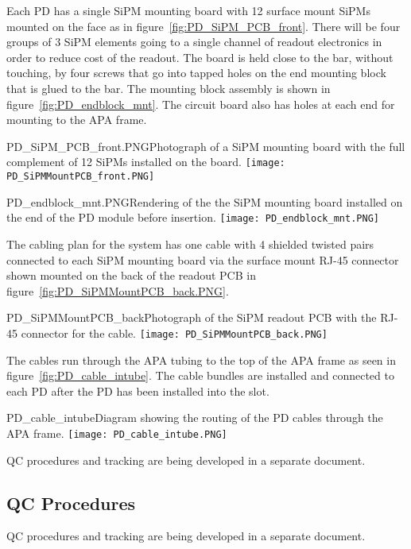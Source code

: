 Each PD has a single SiPM mounting board with 12 surface mount SiPMs 
mounted on the face as in figure~\ref{fig:PD_SiPM_PCB_front}.
There will be four groups of $3$ SiPM elements going to a single 
channel of readout electronics in order to reduce cost of the readout.
The board is held close to the bar, without touching, by four screws that go into 
tapped holes on the end  mounting block that is glued to the bar.  
The mounting block assembly is shown in figure~\ref{fig:PD_endblock_mnt}.
The circuit board also has holes at each end for mounting to the APA frame.  
\begin{cdrfigure}
  {PD_SiPM_PCB_front.PNG}{Photograph of a SiPM mounting board
    with the full complement of 12 SiPMs installed on the board.}
\texttt{[image: PD\_SiPMMountPCB\_front.PNG]}
\end{cdrfigure}
\begin{cdrfigure}
  {PD_endblock_mnt.PNG}{Rendering of the the SiPM mounting board
    installed on the end of the PD module before insertion.}
\texttt{[image: PD\_endblock\_mnt.PNG]}
\end{cdrfigure}


The cabling plan for the system has one cable with 4 shielded twisted pairs 
connected to each SiPM mounting board via the surface mount RJ-45 connector
shown mounted on the back of the readout PCB in 
figure~\ref{fig:PD_SiPMMountPCB_back.PNG}.  
\begin{cdrfigure}
  {PD_SiPMMountPCB_back}{Photograph of the SiPM readout PCB with the 
    RJ-45 connector for the cable.}
\texttt{[image: PD\_SiPMMountPCB\_back.PNG]}
\end{cdrfigure}
The cables run through the APA tubing to the top of the APA frame as seen
in figure~\ref{fig:PD_cable_intube}.
The cable bundles are installed and connected to each PD 
after the PD has been installed into the slot.
\begin{cdrfigure}
  {PD_cable_intube}{Diagram showing the routing of the PD cables
    through the APA frame.}
\texttt{[image: PD\_cable\_intube.PNG]}
\end{cdrfigure}


QC procedures and tracking are being developed in a separate document.

\subsection{QC Procedures}
QC procedures and tracking are being developed in a separate document.


